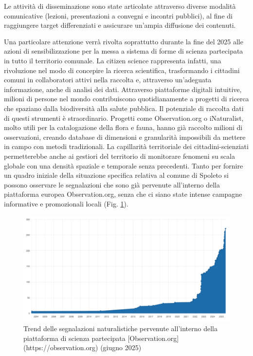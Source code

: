\documentclass[
]{book}
\begin{document}
Le attività di disseminazione sono state articolate attraverso diverse modalità comunicative (lezioni, presentazioni a convegni e incontri pubblici), al fine di raggiungere target differenziati e assicurare un'ampia diffusione dei contenuti.

Una particolare attenzione verrà rivolta soprattutto durante la fine del 2025 alle azioni di sensibilizzazione per la messa a sistema di forme di scienza partecipata in tutto il territorio comunale. La citizen science rappresenta infatti, una rivoluzione nel modo di concepire la ricerca scientifica, trasformando i cittadini comuni in collaboratori attivi nella raccolta e, attraverso un'adeguata informazione, anche di analisi dei dati. Attraverso piattaforme digitali intuitive, milioni di persone nel mondo contribuiscono quotidianamente a progetti di ricerca che spaziano dalla biodiversità alla salute pubblica. Il potenziale di raccolta dati di questi strumenti è straordinario. Progetti come Observation.org o iNaturalist, molto utili per la catalogazione della flora e fauna, hanno già raccolto milioni di osservazioni, creando database di dimensioni e granularità impossibili da mettere in campo con metodi tradizionali. La capillarità territoriale dei cittadini-scienziati permetterebbe anche ai gestiori del territorio di monitorare fenomeni su scala globale con una densità spaziale e temporale senza precedenti.
Tanto per fornire un quadro iniziale della situazione specifica relativa al comune di Spoleto si possono osservare le segnalazioni che sono già pervenute all'interno della piattaforma europea Observation.org, senza che ci siano state intense campagne informative e promozionali locali (Fig. \ref{fig:obs2025}).

\begin{figure}

{\centering \includegraphics[width=\linewidth]{./figs/observationPlot} 

}

\caption{Trend delle segnalazioni naturalistiche pervenute all'interno della piattaforma di scienza partecipata [Observation.org](https://observation.org) (giugno 2025)}\label{fig:obs2025}
\end{figure}
\end{document}
